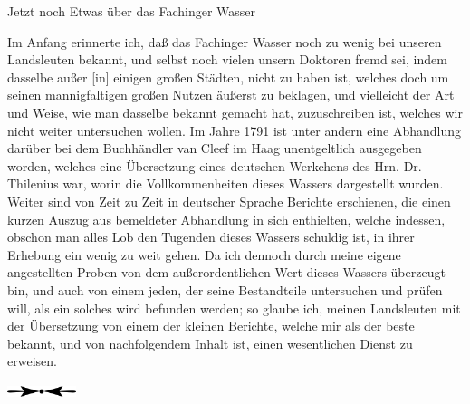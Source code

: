 \documentclass[11pt,a5paper,twoside]{memoir}
\begin{document}

\newpage

\begin{center}
\Large Jetzt noch Etwas über das Fachinger Wasser\par
\end{center}

Im Anfang erinnerte ich,
daß das Fachinger Wasser noch zu wenig bei unseren Landsleuten bekannt,
und selbst noch vielen unsern Doktoren fremd sei,
indem dasselbe außer [in] einigen großen Städten, nicht zu haben ist,
welches doch um seinen mannigfaltigen großen Nutzen äußerst zu beklagen,
und vielleicht der Art und Weise,
wie man dasselbe bekannt gemacht hat,
zuzuschreiben ist, welches wir nicht weiter untersuchen wollen.
Im Jahre 1791 ist unter andern eine Abhandlung darüber
bei dem Buchhändler van Cleef im Haag%
%
unentgeltlich ausgegeben worden,
welches eine Übersetzung eines deutschen Werkchens
des Hrn. Dr. Thilenius war,
worin die Vollkommenheiten dieses Wassers dargestellt wurden.
Weiter sind von Zeit zu Zeit in deutscher Sprache Berichte erschienen,
die einen kurzen Auszug aus bemeldeter Abhandlung in sich enthielten,
welche indessen,
obschon man alles Lob den Tugenden dieses Wassers schuldig ist,
in ihrer Erhebung ein wenig zu weit gehen.
Da ich dennoch durch meine eigene angestellten Proben
von dem außerordentlichen Wert dieses Wassers überzeugt bin,
und auch von einem jeden,
der seine Bestandteile untersuchen und prüfen will,
als ein solches wird befunden werden;
so glaube ich,
meinen Landsleuten mit der Übersetzung von einem der kleinen Berichte,
welche mir als der beste bekannt,
und von nachfolgendem Inhalt ist,
einen wesentlichen Dienst zu erweisen.

\vfill
\begin{center}
\includegraphics[width=2cm]{figures/div1}
\end{center}
\vfill
\end{document}
